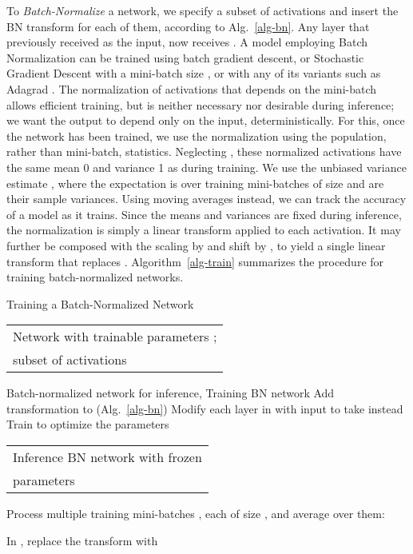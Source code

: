 \documentclass[twocolumn]{article}
\begin{document}
To {\em Batch-Normalize} a network, we specify a subset of activations
and insert the BN transform for each of them, according to
Alg.~\ref{alg-bn}. Any layer that previously received  as the
input, now receives .  A model employing Batch
Normalization can be trained using batch gradient descent, or
Stochastic Gradient Descent with a mini-batch size , or with any
of its variants such as Adagrad \cite{adagrad}.  The normalization of activations
that depends on the mini-batch allows efficient training, but is
neither necessary nor desirable during inference; we want the output
to depend only on the input, deterministically. For this, once the
network has been trained, we use the
normalization  using
the population, rather than mini-batch, statistics. Neglecting
, these normalized activations have the same mean 0 and
variance 1 as during training. We use the unbiased variance estimate
, where the
expectation is over training mini-batches of size  and
 are their sample variances. Using moving averages
instead, we can track the accuracy of a model as it trains.  Since the
means and variances are fixed during inference, the normalization is
simply a linear transform applied to each activation. It may further
be composed with the scaling by  and shift by , to
yield a single linear transform that replaces .
Algorithm~\ref{alg-train} summarizes the procedure for training
batch-normalized networks.

\begin{algorithm}
\caption{Training a Batch-Normalized Network}
\label{alg-train}
\begin{algorithmic}[1]
\REQUIRE 
\begin{tabular}[t]{@{}l}
Network  with trainable  parameters ;\\
 subset of activations 
 \end{tabular}
\ENSURE  Batch-normalized network  for inference, 
\STATE  \quad \COMMENT Training BN network
\FOR{}
\STATE 
Add transformation   to  (Alg.~\ref{alg-bn})
\STATE
Modify each layer in  with input  to take  instead
\ENDFOR
\STATE
Train  to optimize the parameters 
\STATE \vspace{.03in}
\quad \begin{tabular}[t]{@{}l}\COMMENT Inference BN network with frozen\\ \COMMENT parameters \end{tabular}
\FOR{}
\STATE {}
\STATE Process multiple training mini-batches  , each of size , and average over them:
\vspace{-.1in}

\STATE 
\vspace{-.1in}
In , replace the transform  with\, 
\ENDFOR
\end{algorithmic}
\end{algorithm}
\end{document}
